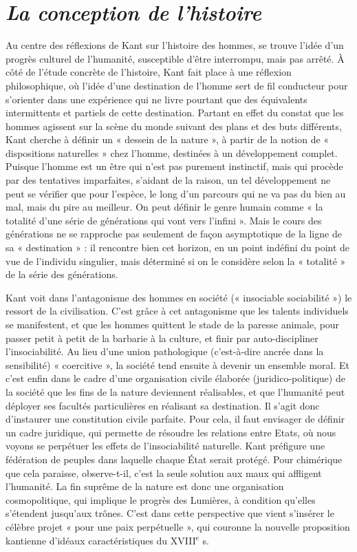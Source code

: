 
\section{{\it La conception de l’histoire}}

Au centre des réflexions de Kant sur
l’histoire des hommes, se trouve l’idée
d’un progrès culturel de l’humanité, susceptible
d’être interrompu, mais pas
arrêté. À côté de l’étude concrète de l’histoire,
Kant fait place à une réflexion philosophique,
où l’idée d’une destination de
l'homme sert de fil conducteur pour
s'orienter dans une expérience qui ne
livre pourtant que des équivalents intermittents
et partiels de cette destination.
Partant en effet du constat que les
hommes agissent sur la scène du monde
suivant des plans et des buts différents,
Kant cherche à définir un « dessein de la
nature », à partir de la notion de « dispositions
naturelles » chez l’homme, destinées
à un développement complet. Puisque
l'homme est un être qui n’est pas purement
instinctif, mais qui procède par des
tentatives imparfaites, s’aidant de la raison,
un tel développement ne peut se vérifier
que pour l’espèce, le long d’un
parcours qui ne va pas du bien au mal,
mais du pire au meilleur. On peut définir
le genre humain comme « la totalité d’une
série de générations qui vont vers l’infini ».
Mais le cours des générations ne se
rapproche pas seulement de façon asymptotique
de la ligne de sa « destination » :
il rencontre bien cet horizon, en un point
indéfini du point de vue de l’individu singulier,
mais déterminé si on le considère
selon la « totalité » de la série des générations.

Kant voit dans l’antagonisme des
hommes en société (« insociable sociabilité »)
le ressort de la civilisation. C’est
grâce à cet antagonisme que les talents
individuels se manifestent, et que les
hommes quittent le stade de la paresse
animale, pour passer petit à petit de la
barbarie à la culture, et finir par auto-discipliner
l’insociabilité. Au lieu d’une
union pathologique (c’est-à-dire ancrée
dans la sensibilité) « coercitive », la
société tend ensuite à devenir un
ensemble moral. Et c’est enfin dans le
cadre d’une organisation civile élaborée
(juridico-politique) de la société que les
fins de la nature deviennent réalisables, et
que l’humanité peut déployer ses facultés
particulières en réalisant sa destination. Il
s’agit donc d’instaurer une constitution
civile parfaite. Pour cela, il faut envisager
de définir un cadre juridique, qui permette
de résoudre les relations entre
Etats, où nous voyons se perpétuer les
effets de l’insociabilité naturelle. Kant
préfigure une fédération de peuples dans
laquelle chaque État serait protégé. Pour
chimérique que cela paraisse, observe-t-il,
c’est la seule solution aux maux qui affligent
l'humanité. La fin suprême de la
nature est donc une organisation cosmopolitique,
qui implique le progrès des
Lumières, à condition qu’elles s’étendent
jusqu'aux trônes. C’est dans cette perspective
que vient s’insérer le célèbre projet
« pour une paix perpétuelle », qui
couronne la nouvelle proposition kantienne
d’idéaux caractéristiques du
{\footnotesize XVIII}$^\text{e}$ s.

